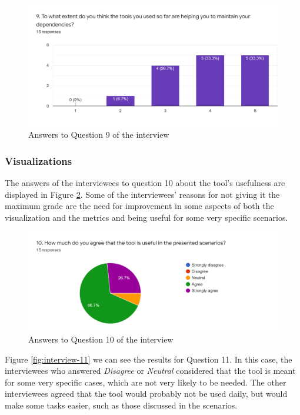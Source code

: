 \begin{figure}[ht!]
\begin{center}
\includegraphics[width=\textwidth]{figures/interview/Question9.png}
\caption{Answers to Question 9 of the interview}
\label{fig:interview-9}
\end{center}
\end{figure}

\subsubsection{Visualizations}

The answers of the interviewees to question 10 about the tool's usefulness are displayed in Figure \ref{fig:interview-10}. Some of the interviewees' reasons for not giving it the maximum grade are the need for improvement in some aspects of both the visualization and the metrics and being useful for some very specific scenarios.

\begin{figure}[ht!]
\begin{center}
\includegraphics[width=\textwidth]{figures/interview/Question10.png}
\caption{Answers to Question 10 of the interview}
\label{fig:interview-10}
\end{center}
\end{figure}

Figure \ref{fig:interview-11} we can see the results for Question 11. In this case, the interviewees who answered \textit{Disagree} or \textit{Neutral} considered that the tool is meant for some very specific cases, which are not very likely to be needed. The other interviewees agreed that the tool would probably not be used daily, but would make some tasks easier, such as those discussed in the scenarios.

